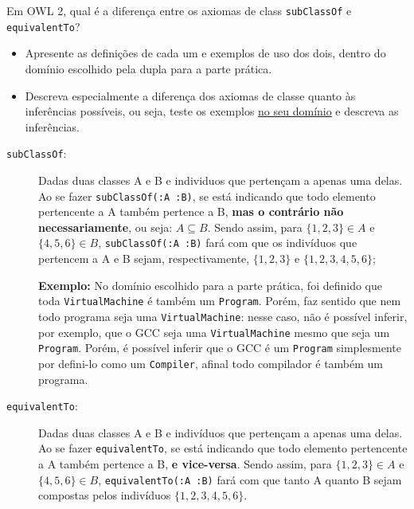 \documentclass[answers]{exam}
\begin{document}
    \begin{questions}
        \question{}
        Em OWL 2, qual é a diferença entre os axiomas de class
        \texttt{subClassOf} e \texttt{equivalentTo}?
        \begin{itemize}
            \item Apresente as definições de cada um e exemplos de uso dos
                dois, dentro do domínio escolhido pela dupla para a parte
                prática.
            \item Descreva especialmente a diferença dos axiomas de classe
                quanto às inferências possíveis, ou seja, teste os exemplos
                \underline{no seu domínio} e descreva as inferências.
        \end{itemize}

        \begin{answer}
            \begin{description}
                \item [\texttt{subClassOf}:] Dadas duas classes A e B e
                    individuos que pertençam a apenas uma delas. Ao se fazer
                    \texttt{subClassOf(:A :B)}, se está indicando que todo
                    elemento pertencente a A também pertence a B, \textbf{mas o
                    contrário não necessariamente}, ou seja: $A \subseteq B$.
                    Sendo assim, para $\{1, 2, 3\} \in A$ e $\{4, 5, 6\} \in
                    B$, \texttt{subClassOf(:A :B)} fará com que os indivíduos
                    que pertencem a A e B sejam, respectivamente, $\{1, 2, 3\}$
                    e $\{1, 2, 3, 4, 5, 6\}$;

                    \textbf{Exemplo:} No domínio escolhido para a parte
                    prática, foi definido que toda \texttt{VirtualMachine} é
                    também um \texttt{Program}. Porém, faz sentido que nem todo
                    programa seja uma \texttt{VirtualMachine}: nesse caso, não
                    é possível inferir, por exemplo, que o GCC seja uma
                    \texttt{VirtualMachine} mesmo que seja um \texttt{Program}.
                    Porém, é possível inferir que o GCC é um \texttt{Program}
                    simplesmente por defini-lo como um \texttt{Compiler},
                    afinal todo compilador é também um programa.

                \item [\texttt{equivalentTo}:] Dadas duas classes A e B e
                    indivíduos que pertençam a apenas uma delas. Ao se fazer
                    \texttt{equivalentTo}, se está indicando que todo elemento
                    pertencente a A também pertence a B, \textbf{e vice-versa}.
                    Sendo assim, para $\{1, 2, 3\} \in A$ e $\{4, 5, 6\} \in
                    B$, \texttt{equivalentTo(:A :B)} fará com que tanto A
                    quanto B sejam compostas pelos indivíduos $\{1, 2, 3, 4,
                    5, 6\}$.
            \end{description}


\end{answer}
\end{questions}
\end{document}
